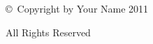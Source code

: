 \newpage
\thispagestyle{empty}

\vspace*{\fill}
\centerline{\copyright\  Copyright by Your Name 2011}
\centerline{All Rights Reserved}
